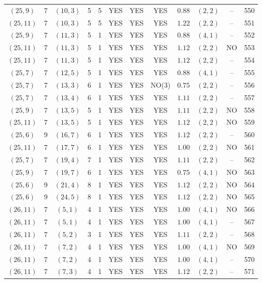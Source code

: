 \begin{longtable}{|c|c|c|c|c|c|c|c|c|c|c|c|}
$(25,9)$ & 7 & $(10,3)$ & 5 & 5 & YES & YES & YES & $0.88$ & $(2,2)$ & -- & 550\\
$(25,11)$ & 7 & $(10,3)$ & 5 & 5 & YES & YES & YES & $1.22$ & $(2,2)$ & -- & 551\\
$(25,9)$ & 7 & $(11,3)$ & 5 & 1 & YES & YES & YES & $0.88$ & $(4,1)$ & -- & 552\\
$(25,11)$ & 7 & $(11,3)$ & 5 & 1 & YES & YES & YES & $1.12$ & $(2,2)$ & NO & 553\\
$(25,11)$ & 7 & $(11,3)$ & 5 & 1 & YES & YES & YES & $1.12$ & $(2,2)$ & -- & 554\\
$(25,7)$ & 7 & $(12,5)$ & 5 & 1 & YES & YES & YES & $0.88$ & $(4,1)$ & -- & 555\\
$(25,7)$ & 7 & $(13,3)$ & 6 & 1 & YES & YES & NO(3) & $0.75$ & $(2,2)$ & -- & 556\\
$(25,7)$ & 7 & $(13,4)$ & 6 & 1 & YES & YES & YES & $1.11$ & $(2,2)$ & -- & 557\\
$(25,9)$ & 7 & $(13,5)$ & 5 & 1 & YES & YES & YES & $1.11$ & $(2,2)$ & NO & 558\\
$(25,11)$ & 7 & $(13,5)$ & 5 & 1 & YES & YES & YES & $1.12$ & $(2,2)$ & NO & 559\\
$(25,6)$ & 9 & $(16,7)$ & 6 & 1 & YES & YES & YES & $1.12$ & $(2,2)$ & -- & 560\\
$(25,11)$ & 7 & $(17,7)$ & 6 & 1 & YES & YES & YES & $1.00$ & $(2,2)$ & NO & 561\\
$(25,7)$ & 7 & $(19,4)$ & 7 & 1 & YES & YES & YES & $1.11$ & $(2,2)$ & -- & 562\\
$(25,9)$ & 7 & $(19,7)$ & 6 & 1 & YES & YES & YES & $0.75$ & $(4,1)$ & NO & 563\\
$(25,6)$ & 9 & $(21,4)$ & 8 & 1 & YES & YES & YES & $1.12$ & $(2,2)$ & NO & 564\\
$(25,6)$ & 9 & $(24,5)$ & 8 & 1 & YES & YES & YES & $1.12$ & $(2,2)$ & NO & 565\\
$(26,11)$ & 7 & $(5,1)$ & 4 & 1 & YES & YES & YES & $1.00$ & $(4,1)$ & NO & 566\\
$(26,11)$ & 7 & $(5,1)$ & 4 & 1 & YES & YES & YES & $1.00$ & $(4,1)$ & -- & 567\\
$(26,11)$ & 7 & $(5,2)$ & 3 & 1 & YES & YES & YES & $1.11$ & $(2,2)$ & -- & 568\\
$(26,11)$ & 7 & $(7,2)$ & 4 & 1 & YES & YES & YES & $1.00$ & $(4,1)$ & NO & 569\\
$(26,11)$ & 7 & $(7,2)$ & 4 & 1 & YES & YES & YES & $1.00$ & $(4,1)$ & -- & 570\\
$(26,11)$ & 7 & $(7,3)$ & 4 & 1 & YES & YES & YES & $1.12$ & $(2,2)$ & -- & 571\\

\end{longtable}
